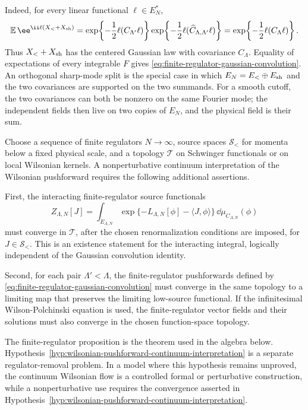 Indeed, for every linear functional \(\ell\in E_N^*\),
\[
  \mathbb E\,\ee^{\ii\ell(X_<+X_{\rm sh})}
  =
  \exp\!\left\{-\frac12\ell(C_{\Lambda'}\ell)\right\}
  \exp\!\left\{-\frac12\ell(\widehat C_{\Lambda,\Lambda'}\ell)\right\}
  =
  \exp\!\left\{-\frac12\ell(C_\Lambda\ell)\right\}.
\]
Thus \(X_<+X_{\rm sh}\) has the centered Gaussian law with covariance
\(C_\Lambda\).  Equality of expectations of every integrable \(F\) gives
\eqref{eq:finite-regulator-gaussian-convolution}.  An orthogonal sharp-mode
split is the special case in which \(E_N=E_<\oplus E_{\rm sh}\) and the two
covariances are supported on the two summands.  For a smooth cutoff, the two
covariances can both be nonzero on the same Fourier mode; the independent
fields then live on two copies of \(E_N\), and the physical field is their
sum.

\begin{hypothesis}
\label{hyp:wilsonian-pushforward-continuum-interpretation}
Choose a sequence of finite regulators \(N\to\infty\), source spaces
\(\mathcal S_{<}\) for momenta below a fixed physical scale, and a topology
\(\mathcal T\) on Schwinger functionals or on local Wilsonian kernels.  A
nonperturbative continuum interpretation of the Wilsonian pushforward requires
the following additional assertions.

First, the interacting finite-regulator source functionals
\[
  Z_{\Lambda,N}[J]
  =
  \int_{E_{\Lambda,N}}
  \exp\{-L_{\Lambda,N}[\phi]-\langle J,\phi\rangle\}\,
  \dd\mu_{C_{\Lambda,N}}(\phi)
\]
must converge in \(\mathcal T\), after the chosen renormalization conditions
are imposed, for \(J\in\mathcal S_<\).  This is an existence statement for the
interacting integral, logically independent of the Gaussian convolution
identity.

Second, for each pair \(\Lambda'<\Lambda\), the finite-regulator pushforwards
defined by \eqref{eq:finite-regulator-gaussian-convolution} must converge in
the same topology to a limiting map that preserves the limiting low-source
functional.  If the infinitesimal Wilson-Polchinski equation is used, the
finite-regulator vector fields and their solutions must also converge in the
chosen function-space topology.
\end{hypothesis}

The finite-regulator proposition is the theorem used in the algebra below.
Hypothesis~\ref{hyp:wilsonian-pushforward-continuum-interpretation} is a
separate regulator-removal problem.  In a model where this hypothesis remains
unproved, the continuum Wilsonian flow is a controlled formal or perturbative
construction, while a nonperturbative use requires the convergence asserted in
Hypothesis~\ref{hyp:wilsonian-pushforward-continuum-interpretation}.

